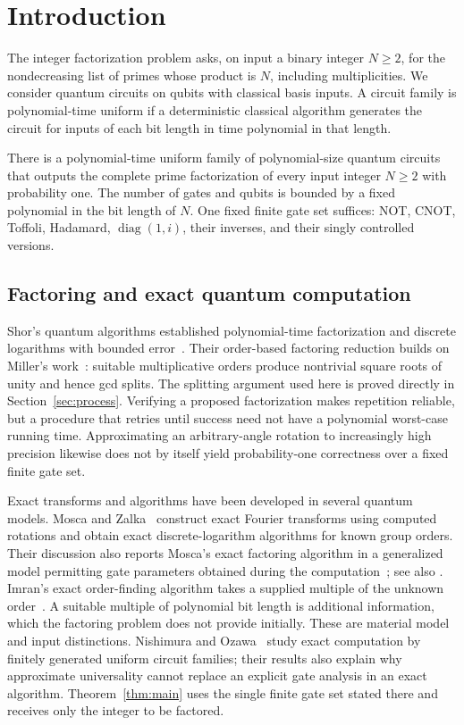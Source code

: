 \section{Introduction}\label{sec:introduction}

The integer factorization problem asks, on input a binary integer $N\ge2$,
for the nondecreasing list of primes whose product is $N$, including
multiplicities. We consider quantum circuits on qubits with classical
basis inputs. A circuit family is polynomial-time uniform if a
deterministic classical algorithm generates the circuit for inputs of each
bit length in time polynomial in that length.

\begin{theorem}\label{thm:main}
There is a polynomial-time uniform family of polynomial-size quantum circuits that outputs the complete prime factorization of every input integer $N\ge2$ with probability one. The number of gates and qubits is bounded by a fixed polynomial in the bit length of $N$. One fixed finite gate set suffices: NOT, CNOT, Toffoli, Hadamard, $\operatorname{diag}(1,i)$, their inverses, and their singly controlled versions.
\end{theorem}

\subsection{Factoring and exact quantum computation}

Shor's quantum algorithms established polynomial-time factorization and
discrete logarithms with bounded error~\cite{Shor}. Their order-based
factoring reduction builds on Miller's work~\cite{Miller,Shor}: suitable
multiplicative orders produce nontrivial square roots of unity and hence
gcd splits. The splitting argument used here is proved directly in
Section~\ref{sec:process}. Verifying a proposed factorization makes
repetition reliable, but a procedure that retries until success need not
have a polynomial worst-case running time. Approximating an arbitrary-angle
rotation to increasingly high precision likewise does not by itself yield
probability-one correctness over a fixed finite gate set.

Exact transforms and algorithms have been developed in several quantum
models. Mosca and Zalka~\cite{MZ} construct exact Fourier transforms using
computed rotations and obtain exact discrete-logarithm algorithms for
known group orders. Their discussion also reports Mosca's exact factoring
algorithm in a generalized model permitting gate parameters obtained
during the computation~\cite[Section~5.2]{MZ}; see also
\cite[Section~1]{Imran}. Imran's exact order-finding algorithm takes a
supplied multiple of the unknown order~\cite[Section~3]{Imran}. A suitable
multiple of polynomial bit length is additional information, which the
factoring problem does not provide initially. These are material model
and input distinctions. Nishimura and Ozawa~\cite{NO} study exact
computation by finitely generated uniform circuit families; their results
also explain why approximate universality cannot replace an explicit gate
analysis in an exact algorithm. Theorem~\ref{thm:main} uses the single
finite gate set stated there and receives only the integer to be factored.

